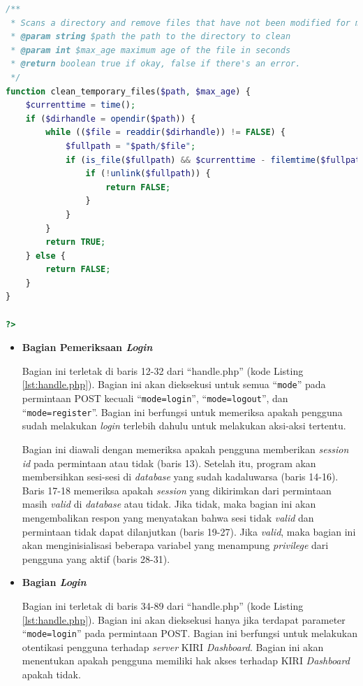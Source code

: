 \documentclass[a4paper,twoside]{article}
\begin{document}
\begin{enumerate}
\begin{lstlisting}[language=PHP,basicstyle=\tiny,caption=handle.php,label={lst:handle.php}]
/**
 * Scans a directory and remove files that have not been modified for max_age
 * @param string $path the path to the directory to clean 
 * @param int $max_age maximum age of the file in seconds
 * @return boolean true if okay, false if there's an error.
 */
function clean_temporary_files($path, $max_age) {
	$currenttime = time();
	if ($dirhandle = opendir($path)) {
		while (($file = readdir($dirhandle)) != FALSE) {
			$fullpath = "$path/$file";
			if (is_file($fullpath) && $currenttime - filemtime($fullpath) > $max_age) {
				if (!unlink($fullpath)) {
					return FALSE;
				}
			}
		}
		return TRUE;
	} else {
		return FALSE;
	}
}

?>
\end{lstlisting}

\begin{itemize}
\item \textbf{Bagian Pemeriksaan \textit{Login}}

Bagian ini terletak di baris 12-32 dari ``handle.php'' (kode Listing \ref{lst:handle.php}). Bagian ini akan dieksekusi untuk semua ``\texttt{mode}'' pada permintaan POST kecuali ``\texttt{mode=login}'', ``\texttt{mode=logout}'', dan ``\texttt{mode=register}''. Bagian ini berfungsi untuk memeriksa apakah pengguna sudah melakukan \textit{login} terlebih dahulu untuk melakukan aksi-aksi tertentu.

Bagian ini diawali dengan memeriksa apakah pengguna memberikan \textit{session id} pada permintaan atau tidak (baris 13). Setelah itu, program akan membersihkan sesi-sesi di \textit{database} yang sudah kadaluwarsa (baris 14-16). Baris 17-18 memeriksa apakah \textit{session} yang dikirimkan dari permintaan masih \textit{valid} di \textit{database} atau tidak. Jika tidak, maka bagian ini akan mengembalikan respon yang menyatakan bahwa sesi tidak \textit{valid} dan permintaan tidak dapat dilanjutkan (baris 19-27). Jika \textit{valid}, maka bagian ini akan menginisialisasi beberapa variabel yang menampung \textit{privilege} dari pengguna yang aktif (baris 28-31).

\item \textbf{Bagian \textit{Login}}

Bagian ini terletak di baris 34-89 dari ``handle.php'' (kode Listing \ref{lst:handle.php}). Bagian ini akan dieksekusi hanya jika terdapat parameter ``\texttt{mode=login}'' pada permintaan POST. Bagian ini berfungsi untuk melakukan otentikasi pengguna terhadap \textit{server} KIRI \textit{Dashboard}. Bagian ini akan menentukan apakah pengguna memiliki hak akses terhadap KIRI \textit{Dashboard} apakah tidak.


\end{itemize}
\end{enumerate}
\end{document}
